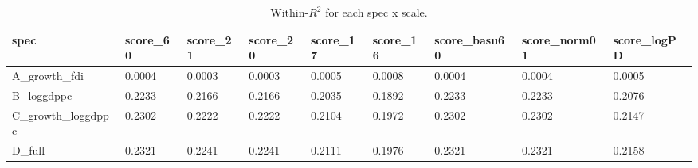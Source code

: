 \begin{table}

\caption{\label{tab:tab:alt_scales_within_r2}Within-$R^2$ for each spec x scale.}
\centering
\begin{tabular}[t]{lllllllll}
\toprule
spec & score\_60 & score\_21 & score\_20 & score\_17 & score\_16 & score\_basu60 & score\_norm01 & score\_logPD\\
\midrule
A\_growth\_fdi & 0.0004 & 0.0003 & 0.0003 & 0.0005 & 0.0008 & 0.0004 & 0.0004 & 0.0005\\
B\_loggdppc & 0.2233 & 0.2166 & 0.2166 & 0.2035 & 0.1892 & 0.2233 & 0.2233 & 0.2076\\
C\_growth\_loggdppc & 0.2302 & 0.2222 & 0.2222 & 0.2104 & 0.1972 & 0.2302 & 0.2302 & 0.2147\\
D\_full & 0.2321 & 0.2241 & 0.2241 & 0.2111 & 0.1976 & 0.2321 & 0.2321 & 0.2158\\
\bottomrule
\end{tabular}
\end{table}
